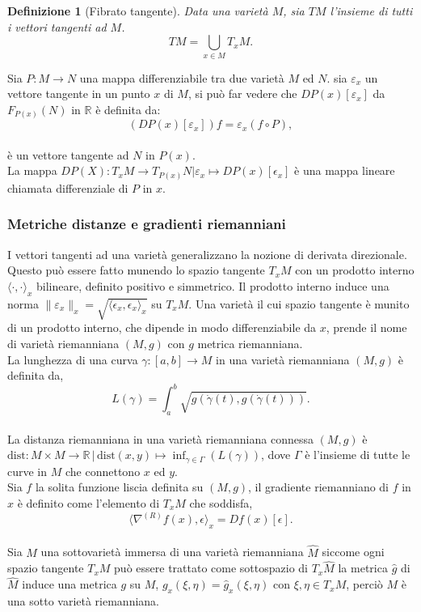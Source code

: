 \documentclass[a4paper, 12pt]{article}
\newtheorem{definition}{Definizione}
\begin{document}
\begin{definition}[Fibrato tangente]
Data una varietà $M$, sia $TM$ l'insieme di tutti i vettori tangenti ad $M$.\\
\[TM = \bigcup_{x \in M} T_xM.\]
\end{definition}
Sia $P:M \to N$ una mappa differenziabile tra due varietà $M$ ed $N$. sia $\varepsilon_x$ un vettore tangente in un punto $x$ di $M$, si può far vedere che $DP(x)[\varepsilon_x]$ da $F_{P(x)}(N)$ in $\mathbb{R}$ è definita da:\\
\[(DP(x)[\varepsilon_x])f = \varepsilon_x(f \circ P),\]\\
è un vettore tangente ad $N$ in $P(x)$.\\
La mappa $DP(X) : T_xM \to T_{P(x)}N | \varepsilon_x \mapsto DP(x)[\epsilon_x]$ è una mappa lineare chiamata differenziale di $P$ in $x$.
\subsubsection{Metriche distanze e gradienti riemanniani}
I vettori tangenti ad una varietà generalizzano la nozione di derivata direzionale. Questo può essere fatto munendo lo spazio tangente $T_xM$ con un prodotto interno $\langle \cdot, \cdot \rangle_x$ bilineare, definito positivo e simmetrico. Il prodotto interno induce una norma $\| \varepsilon_x \|_x = \sqrt{\langle \epsilon_x, \epsilon_x \rangle_x}$ su $T_xM$. Una varietà il cui spazio tangente è munito di un prodotto interno, che dipende in modo differenziabile da $x$, prende il nome di varietà riemanniana $(M, g)$ con $g$ metrica riemanniana.\\
La lunghezza di una curva $\gamma:[a,b] \to M$ in una varietà riemanniana $(M, g)$ è definita da,\\
\[L(\gamma) = \int_a^b \sqrt{g(\dot{\gamma} (t), g(\dot{\gamma} (t)))}.\]\\
La distanza riemanniana in una varietà riemanniana connessa $(M,g)$ è $\mathrm{dist}: M \times M \to \mathbb{R} \, | \, \mathrm{dist}(x,y) \mapsto \inf_{\gamma \in \Gamma}(L(\gamma))$, dove $\Gamma$ è l'insieme di tutte le curve in $M$ che connettono $x$ ed $y$.\\
Sia $f$ la solita funzione liscia definita su $(M,g)$, il gradiente riemanniano di $f$ in $x$ è definito come l'elemento di $T_xM$ che soddisfa,\\
\[\langle \nabla^{(R)} f(x), \epsilon \rangle_x = Df(x)[\epsilon].\]\\
Sia $M$ una sottovarietà immersa di una varietà riemanniana $\widehat{M}$ siccome ogni spazio tangente $T_xM$ può essere trattato come sottospazio di $T_x\widehat{M}$ la metrica $\widehat{g}$ di $\widehat{M}$ induce una metrica $g$ su $M$, $g_x(\xi, \eta) = \widehat{g}_x(\xi, \eta)$ con $\xi, \eta \in T_xM$, perciò $M$ è una sotto varietà riemanniana.
\end{document}
